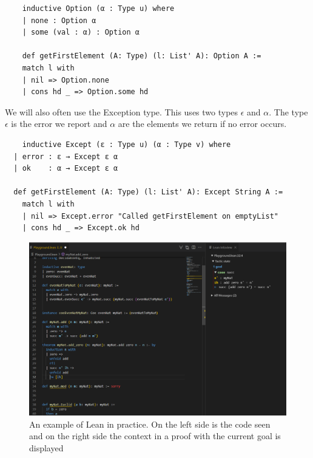 \begin{lstlisting}
    inductive Option (α : Type u) where
    | none : Option α
    | some (val : α) : Option α

    def getFirstElement (A: Type) (l: List' A): Option A :=
    match l with
    | nil => Option.none
    | cons hd _ => Option.some hd
\end{lstlisting}

We will also often use the Exception type. This uses two types $\epsilon$ and $\alpha$. The type $\epsilon$ is the error we report and $\alpha$ are the elements we return if no error occurs.


\begin{lstlisting}
    inductive Except (ε : Type u) (α : Type v) where
  | error : ε → Except ε α
  | ok    : α → Except ε α

  def getFirstElement (A: Type) (l: List' A): Except String A :=
    match l with
    | nil => Except.error "Called getFirstElement on emptyList"
    | cons hd _ => Except.ok hd
\end{lstlisting}

\begin{figure}[H]
    \centering
    \includegraphics[width=\textwidth]{Lean_example2.png}
    \caption{An example of Lean in practice. On the left side is the code seen and on the right side the context in a proof with the current goal is displayed}
\end{figure}
